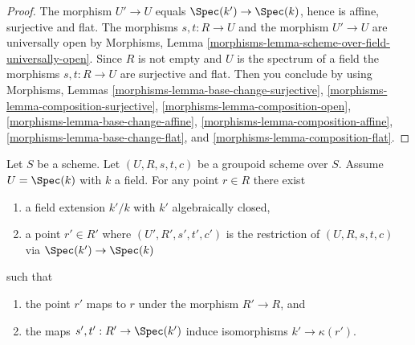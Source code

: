 \begin{proof}
The morphism $U' \to U$ equals $\Spec(k') \to \Spec(k)$,
hence is affine, surjective and flat. The morphisms $s, t : R \to U$
and the morphism $U' \to U$ are universally open by
Morphisms, Lemma \ref{morphisms-lemma-scheme-over-field-universally-open}.
Since $R$ is not empty and $U$ is the spectrum of a field the morphisms
$s, t : R \to U$ are surjective and flat. Then you conclude by using
Morphisms, Lemmas \ref{morphisms-lemma-base-change-surjective},
\ref{morphisms-lemma-composition-surjective},
\ref{morphisms-lemma-composition-open},
\ref{morphisms-lemma-base-change-affine},
\ref{morphisms-lemma-composition-affine},
\ref{morphisms-lemma-base-change-flat}, and
\ref{morphisms-lemma-composition-flat}.
\end{proof}

\begin{lemma}
\label{lemma-groupoid-on-field-explain-points}
Let $S$ be a scheme. Let $(U, R, s, t, c)$ be a groupoid scheme
over $S$. Assume $U = \Spec(k)$ with $k$ a field.
For any point $r \in R$ there exist
\begin{enumerate}
\item a field extension $k'/k$ with $k'$ algebraically closed,
\item a point $r' \in R'$ where $(U', R', s', t', c')$ is the
restriction of $(U, R, s, t, c)$ via $\Spec(k') \to \Spec(k)$
\end{enumerate}
such that
\begin{enumerate}
\item the point $r'$ maps to $r$ under the morphism $R' \to R$, and
\item the maps $s', t' : R' \to \Spec(k')$ induce isomorphisms
$k' \to \kappa(r')$.
\end{enumerate}
\end{lemma}

